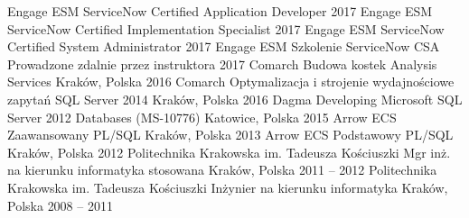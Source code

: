 \begin{cventries}
	\cventry
		{Engage ESM}
		{ServiceNow Certified Application Developer}
		{}
		{2017}
		{}
	\cventry
		{Engage ESM}
		{ServiceNow Certified Implementation Specialist}
		{}
		{2017}
		{}
	\cventry
		{Engage ESM}
		{ServiceNow Certified System Administrator}
		{}
		{2017}
		{}
	\cventry
		{Engage ESM}
		{Szkolenie ServiceNow CSA}
		{Prowadzone zdalnie przez instruktora}
		{2017}
		{}
	\cventry
		{Comarch}
		{Budowa kostek Analysis Services}
		{Kraków, Polska}
		{2016}
		{}
	\cventry
		{Comarch}
		{Optymalizacja i strojenie wydajnościowe zapytań SQL Server 2014}
		{Kraków, Polska}
		{2016}
		{}
	\cventry
		{Dagma}
		{Developing Microsoft SQL Server 2012 Databases (MS-10776)}
		{Katowice, Polska}
		{2015}
		{}
	\cventry
		{Arrow ECS}
		{Zaawansowany PL/SQL}
		{Kraków, Polska}
		{2013}
		{}
	\cventry
		{Arrow ECS}
		{Podstawowy PL/SQL}
		{Kraków, Polska}
		{2012}
		{}
	\cventry
		{Politechnika Krakowska im. Tadeusza Kościuszki}
		{Mgr inż. na kierunku informatyka stosowana}
		{Kraków, Polska} 
		{2011 -- 2012}
		{}
	\cventry
		{Politechnika Krakowska im. Tadeusza Kościuszki}
		{Inżynier na kierunku informatyka}
		{Kraków, Polska}
		{2008 -- 2011} 
		{}
\end{cventries}
